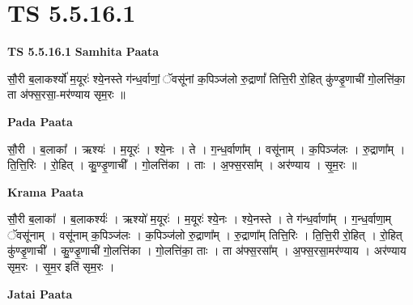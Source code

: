 \documentclass[17pt]{extarticle}
\begin{document}
\section{ TS 5.5.16.1 }

\textbf{TS 5.5.16.1 } \newline
\textbf{Samhita Paata} \newline

सौ॒री ब॒लाकर्श्यो॑ म॒यूरः॑ श्ये॒नस्ते ग॑न्ध॒र्वाणां॒ ॅवसू॑नां क॒पिञ्ज॑लो रु॒द्राणां᳚ तित्ति॒री रो॒हित् कु॑ण्डृ॒णाची॑ गो॒लत्ति॑का॒ ता अ॑फ्स॒रसा॒-मर॑ण्याय सृम॒रः ॥ \newline

\textbf{Pada Paata} \newline

सौ॒री । ब॒लाका᳚ । ऋश्यः॑ । म॒यूरः॑ । श्ये॒नः । ते । ग॒न्ध॒र्वाणा᳚म् । वसू॑नाम् । क॒पिञ्ज॑लः । रु॒द्राणा᳚म् । ति॒त्ति॒रिः । रो॒हित् । कु॒ण्डृ॒णाची᳚ । गो॒लत्ति॑का । ताः । अ॒फ्स॒रसा᳚म् । अर॑ण्याय । सृ॒म॒रः ॥  \newline


\textbf{Krama Paata} \newline

सौ॒री ब॒लाका᳚ । ब॒लाकर्श्यः॑ । ऋश्यो॑ म॒यूरः॑ । म॒यूरः॑ श्ये॒नः । श्ये॒नस्ते । ते ग॑न्ध॒र्वाणा᳚म् । ग॒न्ध॒र्वाणा॒म् ॅवसू॑नाम् । वसू॑नाम् क॒पिञ्ज॑लः । क॒पिञ्ज॑लो रु॒द्राणा᳚म् । रु॒द्राणा᳚म् तित्ति॒रिः । ति॒त्ति॒री रो॒हित् । रो॒हित् कु॑ण्डृ॒णाची᳚ । कु॒ण्डृ॒णाची॑ गो॒लत्ति॑का । गो॒लत्ति॑का॒ ताः । ता अ॑फ्स॒रसा᳚म् । अ॒फ्स॒रसा॒मर॑ण्याय । अर॑ण्याय सृम॒रः । सृ॒म॒र इति॑ सृम॒रः । \newline

\textbf{Jatai Paata} \newline
\end{document}
